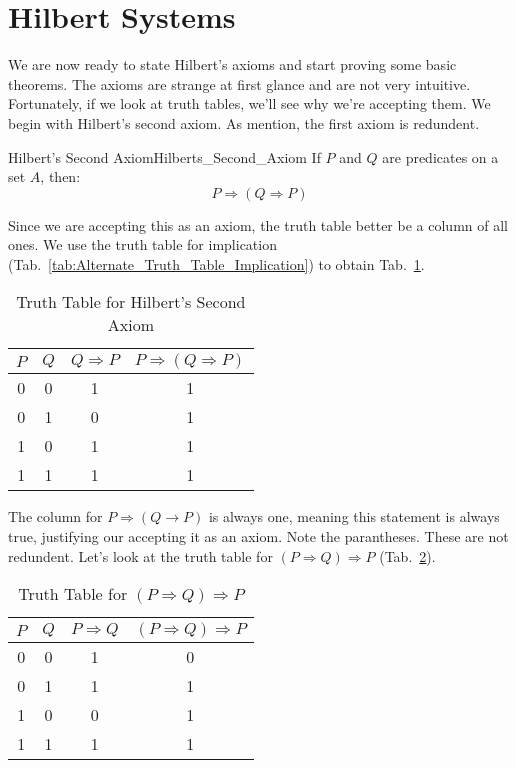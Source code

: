 \section{Hilbert Systems}
    We are now ready to state Hilbert's axioms and start proving some basic
    theorems. The axioms are strange at first glance and are not very intuitive.
    Fortunately, if we look at truth tables, we'll see why we're accepting them.
    We begin with Hilbert's second axiom. As mention, the first axiom is
    redundent.
    \begin{faxiom}{Hilbert's Second Axiom}{Hilberts_Second_Axiom}
        If $P$ and $Q$ are \glspl{predicate} on a \gls{set} $A$, then:%
        \begin{equation*}
            P\Rightarrow(Q\Rightarrow{P})
        \end{equation*}
    \end{faxiom}
    Since we are accepting this as an axiom, the truth table better be a column
    of all ones. We use the truth table for implication
    (Tab.~\ref{tab:Alternate_Truth_Table_Implication}) to obtain
    Tab.~\ref{tab:Truth_Table_Hilbert_Second_Axiom}.
    \begin{table}[H]
        \centering
        \captionsetup{type=table}
        \begin{tabular}{c|c|c|c}
            $P$&$Q$&$Q\Rightarrow{P}$&$P\Rightarrow(Q\Rightarrow{P})$\\
            \hline
            0&0&1&1\\
            0&1&0&1\\
            1&0&1&1\\
            1&1&1&1
        \end{tabular}
        \caption{Truth Table for Hilbert's Second Axiom}
        \label{tab:Truth_Table_Hilbert_Second_Axiom}
    \end{table}
    The column for $P\Rightarrow(Q\rightarrow{P})$ is always one, meaning this
    statement is always true, justifying our accepting it as an axiom. Note the
    parantheses. These are not redundent. Let's look at the truth table for
    $(P\Rightarrow{Q})\Rightarrow{P}$
    (Tab.~\ref{tab:Truth_Table_P_implies_Q_implies_P}).
    \begin{table}
        \centering
        \captionsetup{type=table}
        \begin{tabular}{c|c|c|c}
            $P$&$Q$&$P\Rightarrow{Q}$&$(P\Rightarrow{Q})\Rightarrow{P}$\\
            \hline
            0&0&1&0\\
            0&1&1&1\\
            1&0&0&1\\
            1&1&1&1
        \end{tabular}
        \caption{Truth Table for $(P\Rightarrow{Q})\Rightarrow{P}$}
        \label{tab:Truth_Table_P_implies_Q_implies_P}
    \end{table}
